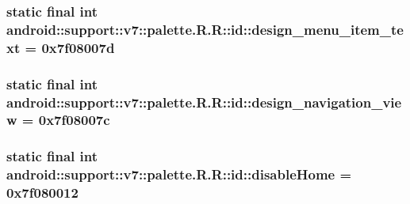 \hypertarget{classandroid_1_1support_1_1v7_1_1palette_1_1_r_1_1id_e24217024a89f093f7a1550a044efcdf}{
\subsubsection[{design\_\-menu\_\-item\_\-text}]{\setlength{\rightskip}{0pt plus 5cm}static final int android::support::v7::palette.R.R::id::design\_\-menu\_\-item\_\-text = 0x7f08007d}}
\label{classandroid_1_1support_1_1v7_1_1palette_1_1_r_1_1id_e24217024a89f093f7a1550a044efcdf}


\hypertarget{classandroid_1_1support_1_1v7_1_1palette_1_1_r_1_1id_738d09c16302b1f5678e1699a29bf424}{
\subsubsection[{design\_\-navigation\_\-view}]{\setlength{\rightskip}{0pt plus 5cm}static final int android::support::v7::palette.R.R::id::design\_\-navigation\_\-view = 0x7f08007c}}
\label{classandroid_1_1support_1_1v7_1_1palette_1_1_r_1_1id_738d09c16302b1f5678e1699a29bf424}


\hypertarget{classandroid_1_1support_1_1v7_1_1palette_1_1_r_1_1id_11bb1d7160e9dae5497003c2e6293954}{
\subsubsection[{disableHome}]{\setlength{\rightskip}{0pt plus 5cm}static final int android::support::v7::palette.R.R::id::disableHome = 0x7f080012}}
\label{classandroid_1_1support_1_1v7_1_1palette_1_1_r_1_1id_11bb1d7160e9dae5497003c2e6293954}


